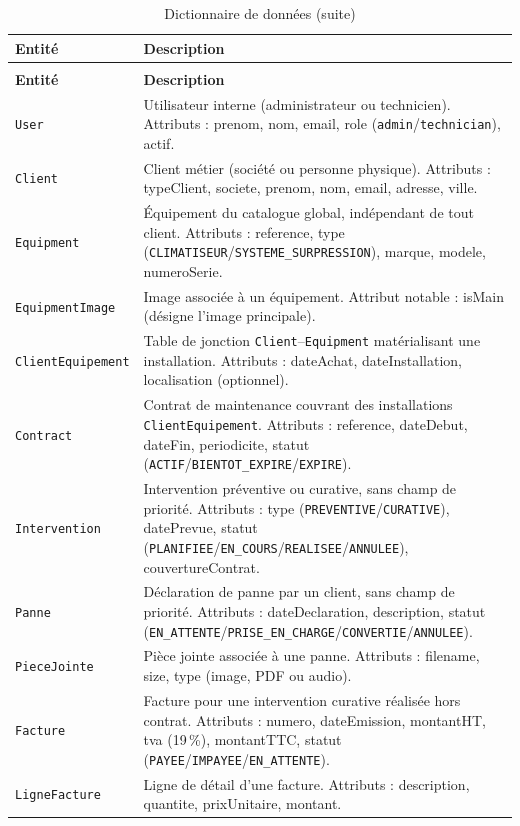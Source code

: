 \begin{longtable}{|p{3.2cm}|p{11.3cm}|}
\caption{Dictionnaire de données}
\label{tab:ch2:dictionnaire} \\
\hline
\textbf{Entité} & \textbf{Description} \\
\hline
\endfirsthead
\caption*{Dictionnaire de données (suite)} \\
\hline
\textbf{Entité} & \textbf{Description} \\
\hline
\endhead
\hline
\endfoot
\hline
\endlastfoot
\texttt{User}
  & Utilisateur interne (administrateur ou technicien).
    Attributs : prenom, nom, email, role (\texttt{admin}/\texttt{technician}), actif. \\
\hline
\texttt{Client}
  & Client métier (société ou personne physique).
    Attributs : typeClient, societe, prenom, nom, email, adresse, ville. \\
\hline
\texttt{Equipment}
  & Équipement du catalogue global, indépendant de tout client.
    Attributs : reference, type (\texttt{CLIMATISEUR}/\texttt{SYSTEME\_SURPRESSION}), marque, modele, numeroSerie. \\
\hline
\texttt{EquipmentImage}
  & Image associée à un équipement.
    Attribut notable : isMain (désigne l'image principale). \\
\hline
\texttt{ClientEquipement}
  & Table de jonction \texttt{Client}–\texttt{Equipment} matérialisant une installation.
    Attributs : dateAchat, dateInstallation, localisation (optionnel). \\
\hline
\texttt{Contract}
  & Contrat de maintenance couvrant des installations \texttt{ClientEquipement}.
    Attributs : reference, dateDebut, dateFin, periodicite, statut (\texttt{ACTIF}/\texttt{BIENTOT\_EXPIRE}/\texttt{EXPIRE}). \\
\hline
\texttt{Intervention}
  & Intervention préventive ou curative, sans champ de priorité.
    Attributs : type (\texttt{PREVENTIVE}/\texttt{CURATIVE}), datePrevue, statut (\texttt{PLANIFIEE}/\texttt{EN\_COURS}/\texttt{REALISEE}/\texttt{ANNULEE}), couvertureContrat. \\
\hline
\texttt{Panne}
  & Déclaration de panne par un client, sans champ de priorité.
    Attributs : dateDeclaration, description, statut (\texttt{EN\_ATTENTE}/\texttt{PRISE\_EN\_CHARGE}/\texttt{CONVERTIE}/\texttt{ANNULEE}). \\
\hline
\texttt{PieceJointe}
  & Pièce jointe associée à une panne.
    Attributs : filename, size, type (image, PDF ou audio). \\
\hline
\texttt{Facture}
  & Facture pour une intervention curative réalisée hors contrat.
    Attributs : numero, dateEmission, montantHT, tva (19\,\%), montantTTC, statut (\texttt{PAYEE}/\texttt{IMPAYEE}/\texttt{EN\_ATTENTE}). \\
\hline
\texttt{LigneFacture}
  & Ligne de détail d'une facture.
    Attributs : description, quantite, prixUnitaire, montant. \\
\hline
\end{longtable}

